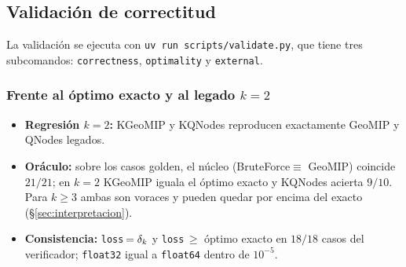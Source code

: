 \documentclass[11pt,letterpaper]{article}
\begin{document}
\subsection{Validación de correctitud}
La validación se ejecuta con \texttt{uv run scripts/validate.py}, que tiene tres
subcomandos: \texttt{correctness}, \texttt{optimality} y \texttt{external}.

\subsubsection{Frente al óptimo exacto y al legado $k=2$}
\begin{itemize}
	\item \textbf{Regresión $k=2$:} KGeoMIP y KQNodes reproducen exactamente GeoMIP
	      y QNodes legados.
	\item \textbf{Oráculo:} sobre los casos golden, el núcleo (BruteForce$\equiv$
	      GeoMIP) coincide $21/21$; en $k=2$ KGeoMIP iguala el óptimo exacto y KQNodes
	      acierta $9/10$. Para $k\ge 3$ ambas son voraces y pueden quedar por encima del
	      exacto (§\ref{sec:interpretacion}).
	\item \textbf{Consistencia:} \texttt{loss}\,$=\delta_k$ y \texttt{loss}\,$\ge$ óptimo
	      exacto en $18/18$ casos del verificador; \texttt{float32} igual a
	      \texttt{float64} dentro de $10^{-5}$.
\end{itemize}
\end{document}
